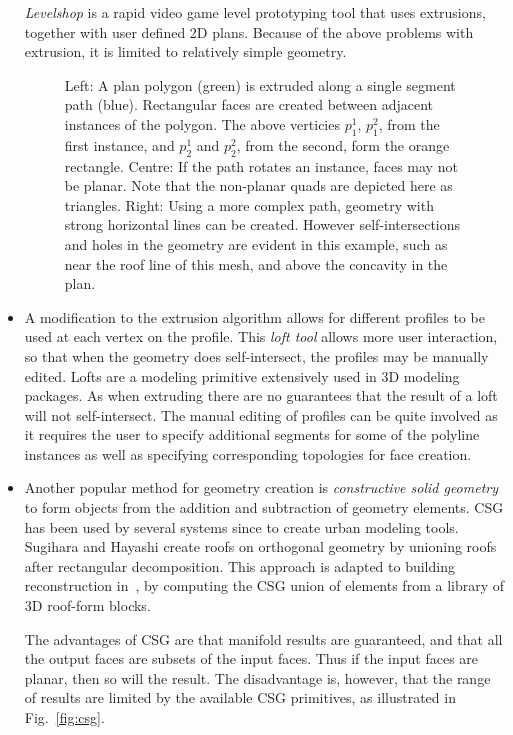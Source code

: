 \begin{itemize}
{\emph{Levelshop}\cite{Fong11} is a rapid video game level prototyping tool that uses extrusions, together with user defined 2D plans. Because of the above problems with extrusion, it is limited to relatively simple geometry.}

\begin{figure}
  \centering
  \def\svgwidth{1.0\columnwidth}
  
  \caption[Failure cases with extrude tool]{\label{fig:Extrude}Left: A plan polygon (green) is extruded along a single segment path (blue). Rectangular faces are created between adjacent instances of the polygon. The above verticies $p^1_1$, $p^2_1$, from the first instance, and $p^1_2$ and $p^2_2$, from the second, form the orange rectangle. Centre: If the path rotates an instance, faces may not be planar. Note that the non-planar quads are depicted here as triangles. Right: Using a more complex path, geometry with strong horizontal lines can be created. However self-intersections and holes in the geometry are evident in this example, such as near the roof line of this mesh, and above the concavity in the plan.}
\end{figure}

\item{A modification to the extrusion algorithm allows for different profiles to be used at each vertex on the profile. This \emph{loft tool} allows more  user  interaction, so that when the geometry does self-intersect, the profiles may be manually edited. Lofts are a modeling primitive extensively used in 3D modeling packages. As when extruding there are no guarantees that the result of a loft will not self-intersect. The manual editing of profiles can be quite involved as it requires the user to specify additional segments for some of the polyline instances as well as specifying corresponding topologies for face creation.}

\item{Another popular method for geometry creation is \emph{constructive solid geometry}\cite{Atherton83} to form objects from the addition and subtraction of geometry elements. CSG has been used by several systems since to create urban modeling tools. Sugihara and Hayashi\cite{Sugihara08} create roofs on orthogonal geometry by unioning roofs after rectangular decomposition. This approach is adapted to building reconstruction in~\cite{Lafarge10}, by computing the CSG union of elements from a library of 3D roof-form blocks.

The advantages of CSG are that manifold results are guaranteed, and that all the output faces are subsets of the input faces. Thus if the input faces are planar, then so will the result. The disadvantage is, however, that the range of results are limited by the available CSG primitives, as illustrated in Fig.~\ref{fig:csg}.}
\end{itemize}

